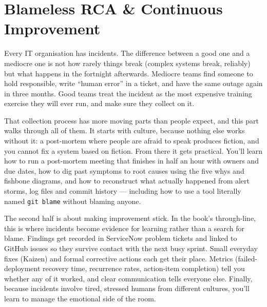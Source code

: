 
\chapter{Blameless RCA \& Continuous Improvement}




Every IT organisation has incidents. The difference between a good one and a mediocre one is not how rarely things break (complex systems break, reliably) but what happens in the fortnight afterwards. Mediocre teams find someone to hold responsible, write ``human error'' in a ticket, and have the same outage again in three months. Good teams treat the incident as the most expensive training exercise they will ever run, and make sure they collect on it.


That collection process has more moving parts than people expect, and this part walks through all of them. It starts with culture, because nothing else works without it: a post-mortem where people are afraid to speak produces fiction, and you cannot fix a system based on fiction. From there it gets practical. You'll learn how to run a post-mortem meeting that finishes in half an hour with owners and due dates, how to dig past symptoms to root causes using the five whys and fishbone diagrams, and how to reconstruct what actually happened from alert storms, log files and commit history — including how to use a tool literally named \texttt{git blame} without blaming anyone.


The second half is about making improvement stick. In the book's through-line, this is where incidents become evidence for learning rather than a search for blame. Findings get recorded in ServiceNow problem tickets and linked to GitHub issues so they survive contact with the next busy sprint. Small everyday fixes (Kaizen) and formal corrective actions each get their place. Metrics (failed-deployment recovery time, recurrence rates, action-item completion) tell you whether any of it worked, and clear communication tells everyone else. Finally, because incidents involve tired, stressed humans from different cultures, you'll learn to manage the emotional side of the room.


